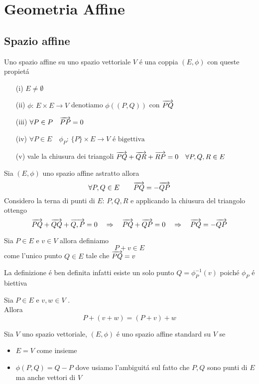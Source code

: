 %
%

\section{Geometria Affine}
\subsection{Spazio affine}
\begin{defn}\bianco
Uno spazio affine su uno spazio vettoriale $V$ \'e una coppia $(E,\phi)$ con queste propiet\'a
\begin{itemize}
\item[(i)]$E \neq \emptyset$
\item[(ii)]$\phi:\, E \times E \to V $ denotiamo $ \phi((P,Q)) $ con $ \overrightarrow{PQ}$
\item[(iii)]$\forall P \in P \quad \overrightarrow{PP}=0$
\item[(iv)]$\forall P \in E \quad \phi_P:\, \{ P \} \times E \to V  \text{ \'e bigettiva } $
\item[(v)]vale la chiusura dei triangoli $ \overrightarrow{PQ} + \overrightarrow{QR}+\overrightarrow{RP}=0 \quad
 \forall P,Q,R \in E $
\end{itemize}
\end{defn}

\begin{lem}Sia $(E,\phi)$ uno spazio affine astratto allora
$$ \forall P,Q \in E \qquad \overrightarrow{PQ}=-\overrightarrow{QP}$$
\proof Considero la terna di punti di $E$: $P,Q,R$ e applicando la chiusura del triangolo ottengo
$$ \overrightarrow{PQ}+\overrightarrow{QQ}+\overrightarrow{Q,P}=0 \quad \Rightarrow \quad \overrightarrow{PQ}+ \overrightarrow{QP}= 0 \quad \Rightarrow \quad\overrightarrow{PQ}=-\overrightarrow{QP}$$
\endproof
\end{lem}
\spazio
\begin{defn}\bianco
Sia $P\in E $ e $v \in V $ allora definiamo 
$$ P+v  \in E $$
come l'unico punto $ Q \in E $ tale che $ \overrightarrow{PQ}=v$
\begin{oss}La definizione \'e ben definita infatti esiste un solo punto $Q=\phi_P^{-1}(v)$ poich\'e $\phi_P$ \'e biettiva
\end{oss}
\end{defn}
\begin{lem}Sia $P\in E$  e $v,w \in V $ .\\
Allora
$$ P+ (v+w)=(P+v)+w$$
\end{lem}
\spazio
\begin{defn}\bianco
Sia $V$ uno spazio vettoriale, $(E,\phi)$ \'e uno spazio affine standard su $V$ se 
\begin{itemize}
\item $E=V$ come insieme
\item $\phi(P,Q)=Q-P$ dove usiamo l'ambiguit\'a sul fatto che $P,Q$ sono punti di $E$ ma anche vettori di $V$
\end{itemize}
\end{defn}
\newpage

